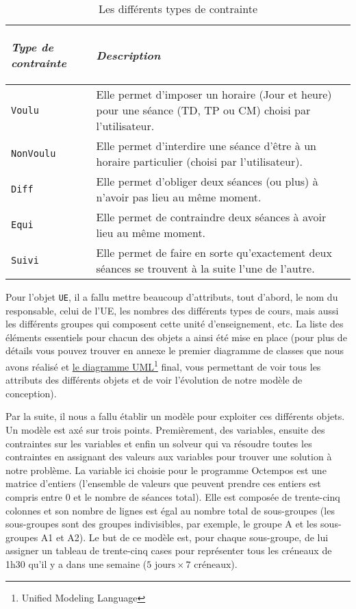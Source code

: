 \documentclass[12pt,a4paper]{article}
\begin{document}
\begin{table}[h]
    \centering
    \label{typeContrainte}
    \begin{tabular}{|p{}| p{}|}
        \hline
        \begin{center} \textit{Type de contrainte} \end{center}& \begin{center} \textit{Description} \end{center}\\
        \hline
        \texttt{Voulu} & Elle permet d'imposer un horaire (Jour et heure) pour une séance (TD, TP ou CM) choisi par l'utilisateur. \\ 
        \hline
        \texttt{NonVoulu} & Elle permet d'interdire une séance d'être à un horaire particulier (choisi par l'utilisateur). \\
        \hline
        \texttt{Diff} & Elle permet d'obliger deux séances (ou plus) à n'avoir pas lieu au même moment. \\ 
        \hline
        \texttt{Equi} & Elle permet de contraindre deux séances à avoir lieu au même moment. \\ 
        \hline
        \texttt{Suivi} & Elle permet de faire en sorte qu'exactement deux séances se trouvent à la suite l'une de l'autre. \\ 
        \hline
    \end{tabular}
    \caption{Les différents types de contrainte}
\end{table}


Pour l’objet \texttt{UE}, il a fallu mettre beaucoup d’attributs, tout d'abord, le nom du responsable, celui de l’UE, les nombres des différents types de cours, mais aussi les différents groupes qui composent cette unité d’enseignement, etc. La liste des éléments essentiels pour chacun des objets a ainsi été mise en place (pour plus de détails vous pouvez trouver en annexe le premier diagramme de classes que nous avons réalisé et \hyperref[diagrammeclasse]{le diagramme UML\footnote{Unified Modeling Language} final}, vous permettant de voir tous les attributs des différents objets et de voir l’évolution de notre modèle de  conception).
\label{model}

Par la suite, il nous a fallu établir un modèle pour exploiter ces différents objets. Un modèle est axé sur trois points. Premièrement, des variables, ensuite des contraintes sur les variables et enfin un solveur qui va résoudre toutes les contraintes en assignant des valeurs aux variables pour trouver une solution à notre problème. La variable ici choisie pour le programme Octempos est une matrice d'entiers (l'ensemble de valeurs que peuvent prendre ces entiers est compris entre 0 et le nombre de séances total). Elle est composée de trente-cinq colonnes et son nombre de lignes est égal au nombre total de sous-groupes (les sous-groupes sont des groupes indivisibles, par exemple, le groupe A et les sous-groupes A1 et A2). Le but de ce modèle est, pour chaque sous-groupe, de lui assigner un tableau de trente-cinq cases pour représenter tous les créneaux de 1h30 qu'il y a dans une semaine ($5 \textrm{ jours} \times 7 \textrm{ créneaux}$).
\end{document}
